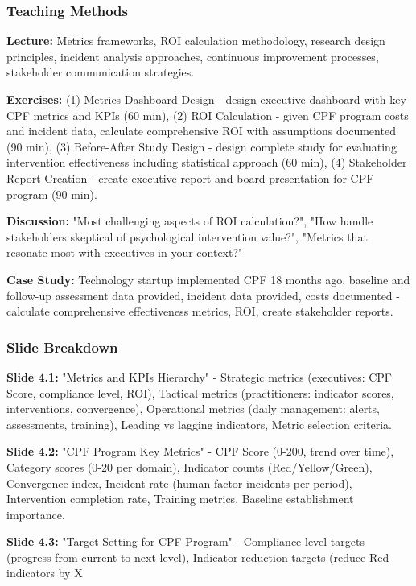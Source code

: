 \documentclass[11pt,a4paper]{article}
\begin{document}
\subsubsection{Teaching Methods}

\textbf{Lecture:} Metrics frameworks, ROI calculation methodology, research design principles, incident analysis approaches, continuous improvement processes, stakeholder communication strategies.

\textbf{Exercises:} (1) Metrics Dashboard Design - design executive dashboard with key CPF metrics and KPIs (60 min), (2) ROI Calculation - given CPF program costs and incident data, calculate comprehensive ROI with assumptions documented (90 min), (3) Before-After Study Design - design complete study for evaluating intervention effectiveness including statistical approach (60 min), (4) Stakeholder Report Creation - create executive report and board presentation for CPF program (90 min).

\textbf{Discussion:} "Most challenging aspects of ROI calculation?", "How handle stakeholders skeptical of psychological intervention value?", "Metrics that resonate most with executives in your context?"

\textbf{Case Study:} Technology startup implemented CPF 18 months ago, baseline and follow-up assessment data provided, incident data provided, costs documented - calculate comprehensive effectiveness metrics, ROI, create stakeholder reports.

\subsubsection{Slide Breakdown}

\textbf{Slide 4.1:} "Metrics and KPIs Hierarchy" - Strategic metrics (executives: CPF Score, compliance level, ROI), Tactical metrics (practitioners: indicator scores, interventions, convergence), Operational metrics (daily management: alerts, assessments, training), Leading vs lagging indicators, Metric selection criteria.

\textbf{Slide 4.2:} "CPF Program Key Metrics" - CPF Score (0-200, trend over time), Category scores (0-20 per domain), Indicator counts (Red/Yellow/Green), Convergence index, Incident rate (human-factor incidents per period), Intervention completion rate, Training metrics, Baseline establishment importance.

\textbf{Slide 4.3:} "Target Setting for CPF Program" - Compliance level targets (progress from current to next level), Indicator reduction targets (reduce Red indicators by X%
\end{document}
